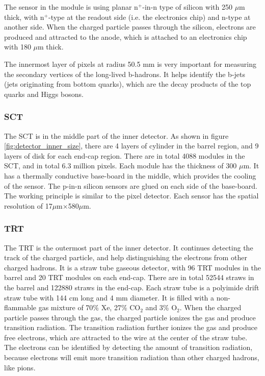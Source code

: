 The sensor in the module is using planar n$^{+}$-in-n type of silicon with 250 $\mu$m thick, with n$^{+}$-type at the readout side (i.e. the electronics chip) and n-type at another side.
When the charged particle passes through the silicon, electrons are produced and attracted to the anode, which is attached to an electronics chip with 180 $\mu$m thick.

The innermost layer of pixels at radius 50.5 mm is very important for measuring the secondary vertices of the long-lived b-hadrons.
It helps identify the b-jets (jets originating from bottom quarks), which are the decay products of the top quarks and Higgs bosons.

\subsubsection{SCT}
The SCT is in the middle part of the inner detector.
As shown in figure \ref{fig:detector_inner_size}, there are 4 layers of cylinder in the barrel region, and 9 layers of disk for each end-cap region.
There are in total 4088 modules in the SCT, and in total 6.3 million pixels.
Each module has the thickness of 300 $\mu$m.
It has a thermally conductive base-board in the middle, which provides the cooling of the sensor.
The p-in-n silicon sensors are glued on each side of the base-board.
The working principle is similar to the pixel detector.
Each sensor has the spatial resolution of 17$\mu$m$\times$580$\mu$m.

\subsubsection{TRT}
The TRT is the outermost part of the inner detector.
It continues detecting the track of the charged particle, and help distinguishing the electrons from other charged hadrons.
It is a straw tube gaseous detector, with 96 TRT modules in the barrel and 20 TRT modules on each end-cap.
There are in total 52544 straws in the barrel and 122880 straws in the end-cap.
Each straw tube is a polyimide drift straw tube with 144 cm long and 4 mm diameter.
It is filled with a non-flammable gas mixture of 70\% Xe, 27\% CO$_2$ and 3\% O$_2$.
When the charged particle passes through the gas, the charged particle ionizes the gas and produce transition radiation.
The transition radiation further ionizes the gas and produce free electrons, which are attracted to the wire at the center of the straw tube.
The electrons can be identified by detecting the amount of transition radiation, because electrons will emit more transition radiation than other charged hadrons, like pions.

